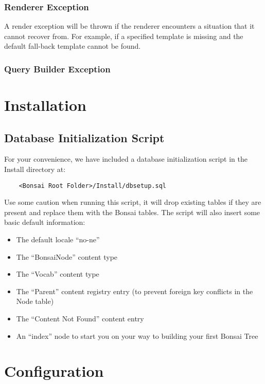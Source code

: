 \documentclass[]{book}
\begin{document}
\subsection{Renderer Exception}
\label{sec:renderExecption}

A render exception will be thrown if the renderer encounters a situation that it cannot recover from. For example, if a specified template is missing and the default fall-back template cannot be found.

\subsection{Query Builder Exception}
\label{sec:queryBuilderExecption}

\chapter{Installation}

\section{Database Initialization Script}
\label{sec:dbinit}

For your convenience, we have included a database initialization script in the Install directory at:
\begin{verbatim}
    <Bonsai Root Folder>/Install/dbsetup.sql
\end{verbatim}

Use some caution when running this script, it will drop existing tables if they are present and replace them with the Bonsai tables. The script will also insert some basic default information:

\begin{itemize}
	\item The default locale \enquote{no-ne}
	\item The \enquote{BonsaiNode} content type
	\item The \enquote{Vocab} content type
	\item The \enquote{Parent} content registry entry (to prevent foreign key conflicts in the Node table)
	\item The \enquote{Content Not Found} content entry
	\item An \enquote{index} node to start you on your way to building your first Bonsai Tree
\end{itemize}

\chapter{Configuration}
\label{chap:Configuration}
\end{document}
